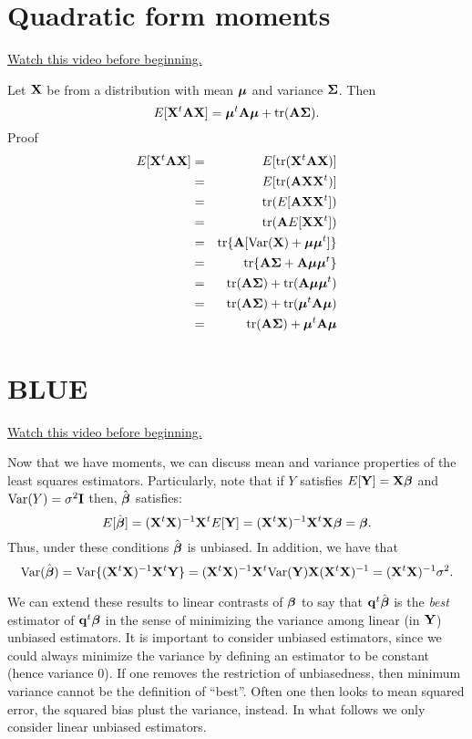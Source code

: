 \section{Quadratic form moments}
\label{sec:qfm}

\href{https://www.youtube.com/watch?v=gdyG8FSxlqc&list=PLpl-gQkQivXhdgUCdaUQcdb31CRe8Mm2y&index=42}{Watch this video before beginning.}

Let $\mathbf{X}$ be from a distribution with mean $\boldsymbol{\mu}$ and variance
$\boldsymbol{\Sigma}$. Then 
$$
E[\mathbf{X}^t \mathbf{A} \mathbf{X}] = \boldsymbol{\mu}^t \mathbf{A} \boldsymbol{\mu} + \mbox{tr}(\mathbf{A} \boldsymbol{\Sigma}).
$$
Proof
\begin{eqnarray*}
E[\mathbf{X}^t \mathbf{A} \mathbf{X}] & = & E[\mbox{tr}(\mathbf{X}^t \mathbf{A} \mathbf{X})]\\
& = & E[\mbox{tr}(\mathbf{A} \mathbf{X} \mathbf{X}^t )]\\
& = &  \mbox{tr}(E[\mathbf{A}  \mathbf{X} \mathbf{X}^t])\\
& = & \mbox{tr}(\mathbf{A} E[\mathbf{X} \mathbf{X}^t])\\
& = & \mbox{tr}\{\mathbf{A} [\mbox{Var}(\mathbf{X}) + \boldsymbol{\mu} \boldsymbol{\mu}^t]\}\\
& = & \mbox{tr}\{\mathbf{A}\boldsymbol{\Sigma} + \mathbf{A} \boldsymbol{\mu} \boldsymbol{\mu}^t\}\\
& = & \mbox{tr}(\mathbf{A}\boldsymbol{\Sigma}) + \mbox{tr}(\mathbf{A} \boldsymbol{\mu} \boldsymbol{\mu}^t)\\
& = & \mbox{tr}(\mathbf{A}\boldsymbol{\Sigma}) + \mbox{tr}(\boldsymbol{\mu}^t \mathbf{A} \boldsymbol{\mu} )\\
& = & \mbox{tr}(\mathbf{A}\boldsymbol{\Sigma}) + \boldsymbol{\mu}^t \mathbf{A} \boldsymbol{\mu} \\
\end{eqnarray*}

\section{BLUE} 

\href{https://www.youtube.com/watch?v=oeN8IzLFHls&list=PLpl-gQkQivXhdgUCdaUQcdb31CRe8Mm2y&index=43}{Watch this video before beginning.}

Now that we have moments, we can discuss mean and variance properties of the 
least squares estimators. Particularly, note that if $Y$ satisfies
$E[\mathbf{Y}] = \mathbf{X} \boldsymbol{\beta}$ and $\mbox{Var}(Y) = \sigma^2 \mathbf{I}$ then, $\hat {\boldsymbol{\beta}}$ 
satisfies: 
$$E[\hat {\boldsymbol{\beta}}] = (\mathbf{X}^t \mathbf{X})^{-1} \mathbf{X}^t E[\mathbf{Y}] = (\mathbf{X}^t \mathbf{X})^{-1} \mathbf{X}^t \mathbf{X} \boldsymbol{\beta} = \boldsymbol{\beta}.$$
Thus, under these conditions $\hat {\boldsymbol{\beta}}$ is unbiased. In addition, we have
that 
$$
\mbox{Var}(\hat {\boldsymbol{\beta}}) = \mbox{Var}\{(\mathbf{X}^t \mathbf{X})^{-1} \mathbf{X}^t \mathbf{Y}\} = (\mathbf{X}^t \mathbf{X})^{-1} \mathbf{X}^t \mbox{Var}(\mathbf{Y}) \mathbf{X} (\mathbf{X}^t \mathbf{X})^{-1}
= (\mathbf{X}^t \mathbf{X})^{-1} \sigma^2. 
$$

We can extend these results to linear contrasts of $\boldsymbol{\beta}$ 
to say that $\mathbf{q}^t \hat {\boldsymbol{\beta}}$ is the {\it best}
estimator of $\mathbf{q}^t \boldsymbol{\beta}$ in the sense of minimizing the variance among
linear (in $\mathbf{Y}$) unbiased estimators. It is important to consider
unbiased estimators, since we could always minimize the variance
by defining an estimator to be constant (hence variance 0). If one
removes the restriction of unbiasedness, then minimum variance cannot
be the definition of ``best''. Often one then looks to mean squared
error, the squared bias plust the variance, instead. In what follows
we only consider linear unbiased estimators.

